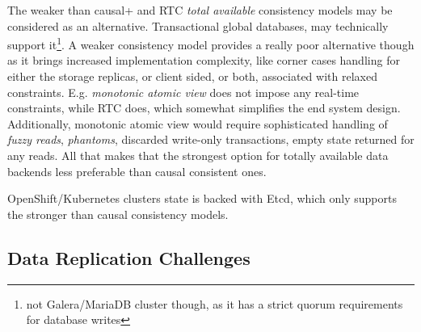\documentclass[conference]{IEEEtran}
\begin{document}
The weaker than causal+ and RTC \textit{total available}\cite{b4}
consistency models may be considered as an alternative. Transactional global
databases\cite{b5}, may technically support it\footnote{not Galera/MariaDB
cluster though, as it has a strict quorum requirements for database writes}. A
weaker consistency model provides a really poor alternative though as it brings
increased implementation complexity, like corner cases handling for either the
storage replicas, or client sided, or both, associated with relaxed
constraints. E.g. \textit{monotonic atomic view}\cite{b4} does not impose any
real-time constraints, while RTC does, which somewhat simplifies
the end system design. Additionally, monotonic atomic view would require
sophisticated handling of \textit{fuzzy reads}\cite{b4},
\textit{phantoms}\cite{b4}, discarded write-only transactions, empty state
returned for any reads. All that makes that the strongest option for totally
available data backends less preferable than causal consistent ones.

OpenShift/Kubernetes clusters state is backed with Etcd, which only supports
the stronger than causal consistency models.

\subsection{Data Replication Challenges}
\end{document}
